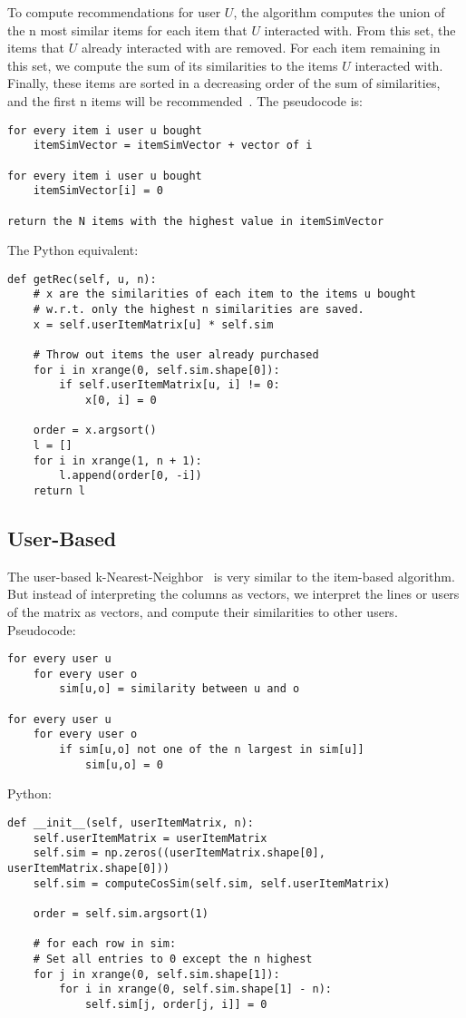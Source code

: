 To compute recommendations for user $U$, the algorithm computes
the union of the n most similar items for each item that $U$ interacted with.
From this set, the items that $U$ already interacted with are removed. For
each item remaining in this set, we compute the sum of its similarities
to the items $U$ interacted with. Finally, these items are sorted in a
decreasing order of the sum of similarities, and the first n items
will be recommended~\cite{Karypis:2001:EIT:502585.502627}.
The pseudocode is:
\begin{lstlisting}[style=pseudocode]
for every item i user u bought
    itemSimVector = itemSimVector + vector of i

for every item i user u bought
    itemSimVector[i] = 0

return the N items with the highest value in itemSimVector
\end{lstlisting}
The Python equivalent:
\begin{lstlisting}[style=python]
def getRec(self, u, n):
    # x are the similarities of each item to the items u bought
    # w.r.t. only the highest n similarities are saved.
    x = self.userItemMatrix[u] * self.sim

    # Throw out items the user already purchased
    for i in xrange(0, self.sim.shape[0]):
        if self.userItemMatrix[u, i] != 0:
            x[0, i] = 0

    order = x.argsort()
    l = []
    for i in xrange(1, n + 1):
        l.append(order[0, -i])
    return l
\end{lstlisting}



\subsection{User-Based}

The user-based k-Nearest-Neighbor~\cite{userbasedknn} is very similar to the item-based algorithm.
But instead of interpreting the columns as vectors, we interpret the
lines or users of the matrix as vectors, and compute their similarities
to other users.
Pseudocode:
\begin{lstlisting}[style=pseudocode]
for every user u
    for every user o
        sim[u,o] = similarity between u and o

for every user u
    for every user o
        if sim[u,o] not one of the n largest in sim[u]]
            sim[u,o] = 0
\end{lstlisting}
Python:
\begin{lstlisting}[style=python]
def __init__(self, userItemMatrix, n):
    self.userItemMatrix = userItemMatrix
    self.sim = np.zeros((userItemMatrix.shape[0], userItemMatrix.shape[0]))
    self.sim = computeCosSim(self.sim, self.userItemMatrix)

    order = self.sim.argsort(1)

    # for each row in sim:
    # Set all entries to 0 except the n highest
    for j in xrange(0, self.sim.shape[1]):
        for i in xrange(0, self.sim.shape[1] - n):
            self.sim[j, order[j, i]] = 0
\end{lstlisting}


